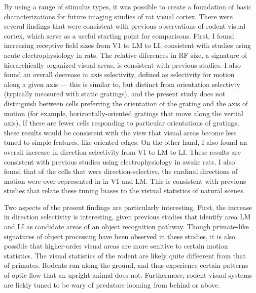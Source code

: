 By using a range of stimulus types, it was possible to create a foundation of basic characterizations for future imaging studies of rat visual cortex. There were several findings that were consistent with previous observations of rodent visual cortex, which serve as a useful starting point for comparisons. First, I found increasing receptive field sizes from V1 to LM to LI, consistent with studies using acute electrophysiology in rats\cite{Vermaercke2014, Tafazoli2017}. The relative diferences in RF size, a signature of hierarchically organized visual areas\cite{DiCarlo2012, Siegle2021}, is consistent with previous studies. I also found an overall decrease in axis selectivity, defined as selectivity for motion along a given axis --- this is similar to, but distinct from orientation selectivty (typically measured with static gratings), and the present study does not distinguish between cells preferring the orientation of the grating and the axis of motion (for example, horizontally-oriented gratings that move along the vertial axis). If there are fewer cells responding to particular orientations of gratings, these results would be consistent with the view that visual areas become less tuned to simple features, like oriented edges. On the other hand, I also found an overall increase in direction selectivity from V1 to LM to LI. These results are consistent with previous studies using electrophysiology in awake rats\cite{Vermaercke2014}. I also found that of the cells that were direction-selective, the cardinal directions of motion were over-represented in in V1 and LM. This is consistent with previous studies that relate these tuning biases to the vistual statistics of natural scenes.  

Two aspects of the present findings are particularly interesting. First, the increase in direction selectivity is interesting, given previous studies that identify area LM and LI as candidate areas of an object recognition pathway\cite{Tafazoli2017,Vermaercke2015, Tafazoli2017}. Though primate-like signatures of object processing have been observed in these studies, it is also possible that higher-order visual areas are more senitive to certain motion statistics. The visual statistics of the rodent are likely quite diffeerent from that of primates. Rodents run along the ground, and thus experience certain patterns of optic flow that an upright animal does not. Furthermore, rodent visual systems are liekly tuned to be wary of predators looming from behind or above. 


